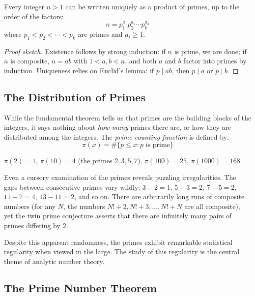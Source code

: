 \begin{theorem}
\label{thm:fta}
Every integer $n > 1$ can be written uniquely as a product of primes, up to the order of the factors:
\[
n = p_1^{a_1} p_2^{a_2} \cdots p_k^{a_k}
\]
where $p_1 < p_2 < \cdots < p_k$ are primes and $a_i \ge 1$.
\end{theorem}

\begin{proof}[Proof sketch]
Existence follows by strong induction: if $n$ is prime, we are done; if $n$ is composite, $n = ab$ with $1 < a, b < n$, and both $a$ and $b$ factor into primes by induction. Uniqueness relies on Euclid's lemma: if $p \mid ab$, then $p \mid a$ or $p \mid b$.
\end{proof}

\subsection{The Distribution of Primes}

While the fundamental theorem tells us that primes are the building blocks of the integers, it says nothing about \emph{how many} primes there are, or how they are distributed among the integers. The \textit{prime counting function} is defined by:
\[
\pi(x) = \#\{p \le x : p \text{ is prime}\}
\]

\begin{example}
$\pi(2) = 1$, \; $\pi(10) = 4$ (the primes $2, 3, 5, 7$), \; $\pi(100) = 25$, \; $\pi(1000) = 168$.
\end{example}

Even a cursory examination of the primes reveals puzzling irregularities. The gaps between consecutive primes vary wildly: $3 - 2 = 1$, $5 - 3 = 2$, $7 - 5 = 2$, $11 - 7 = 4$, $13 - 11 = 2$, and so on. There are arbitrarily long runs of composite numbers (for any $N$, the numbers $N!+2, N!+3, \ldots, N!+N$ are all composite), yet the twin prime conjecture asserts that there are infinitely many pairs of primes differing by $2$.

Despite this apparent randomness, the primes exhibit remarkable statistical regularity when viewed in the large. The study of this regularity is the central theme of analytic number theory.

\subsection{The Prime Number Theorem}

